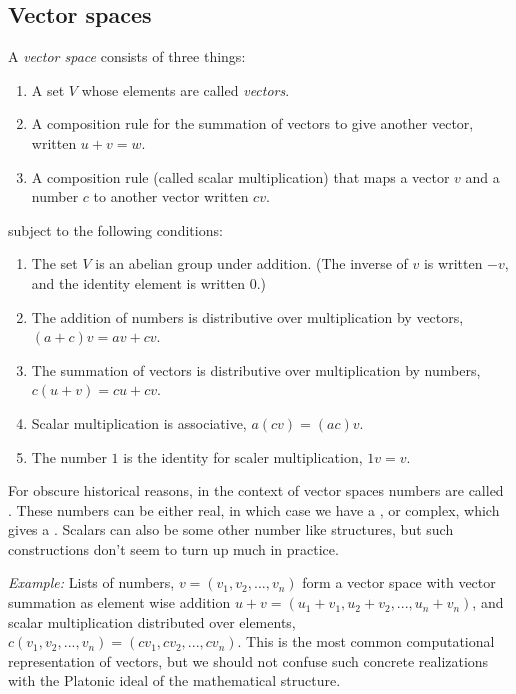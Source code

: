 


\subsection{Vector spaces}
A {\sl vector space} consists of three things:
  \begin{enumerate}
 \item A set $V$ whose elements are called {\sl vectors}.
 \item A composition rule for the summation of vectors to give another vector, written $u+v=w$.
 \item A composition rule (called  scalar multiplication) that maps a vector $v$ and a number $c$ to another vector written $cv$.
 \end{enumerate}
subject to the following conditions:
  \begin{enumerate}
  \item The set $V$ is an abelian group under addition. (The inverse of $v$ is written $-v$, and the identity element is written $0$.)
  \item The addition of numbers is distributive over multiplication by vectors, $(a+c)v=av + cv$.
  \item The summation of vectors is distributive over multiplication by numbers, $c(u+v)=cu + cv$.
  \item Scalar multiplication is associative, $a (cv) = (ac) v$. 
 \item The number $1$ is the identity for scaler multiplication, $1v=v$.
 \end{enumerate}
 For obscure historical reasons, in the context of vector spaces numbers are called .
These numbers can be either real, in which case we have a , or complex, which gives a . Scalars can also be some other number like structures, but such constructions don't seem to turn up much in practice.

{\sl Example:} Lists of numbers, $v=(v_1, v_2, ..., v_n)$ form a vector space with vector summation as element wise addition $u+v = (u_1+v_1, u_2 +v_2, ..., u_n+ v_n)$, and scalar multiplication distributed over elements, $c(v_1, v_2, ..., v_n) =(cv_1, cv_2, ..., cv_n)$. This is the most common computational representation of vectors, but we should not confuse such concrete realizations with the Platonic ideal of the mathematical structure.

